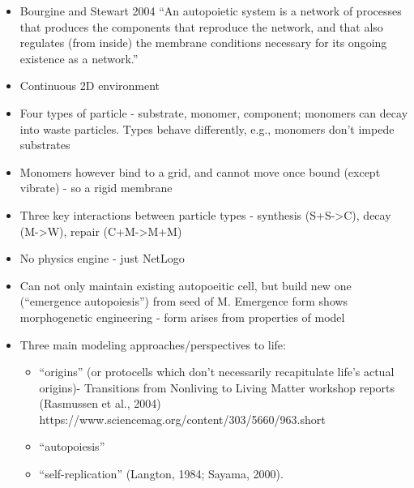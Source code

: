 		\begin{itemize}
			\item
			
			Bourgine and Stewart 2004 ``An autopoietic system is a network of
			processes that produces the components that reproduce the network, and
			that also regulates (from inside) the membrane conditions necessary
			for its ongoing existence as a network.''
			
			\item
			
			Continuous 2D environment
			
			\item
			
			Four types of particle - substrate, monomer, component; monomers can
			decay into waste particles. Types behave differently, e.g., monomers
			don't impede substrates
			
			\item
			
			Monomers however bind to a grid, and cannot move once bound (except
			vibrate) - so a rigid membrane
			
			\item
			
			Three key interactions between particle types - synthesis
			(S+S-\textgreater{}C), decay (M-\textgreater{}W), repair
			(C+M-\textgreater{}M+M)
			
			\item
			
			No physics engine - just NetLogo
			
			\item
			
			Can not only maintain existing autopoeitic cell, but build new one
			(``emergence autopoiesis'') from seed of M. Emergence form shows
			morphogenetic engineering - form arises from properties of model
			
			\item
			
			Three main modeling approaches/perspectives to life:
			
			
			\begin{itemize}
				\item
				
				``origins'' (or protocells which don't necessarily recapitulate
				life's actual origins)- Transitions from Nonliving to Living Matter
				workshop reports (Rasmussen et al., 2004)
				https://www.sciencemag.org/content/303/5660/963.short
				
				\item
				
				``autopoiesis''
				
				\item
				
				``self-replication'' (Langton, 1984; Sayama, 2000).
				
			\end{itemize}
		\end{itemize}
		
